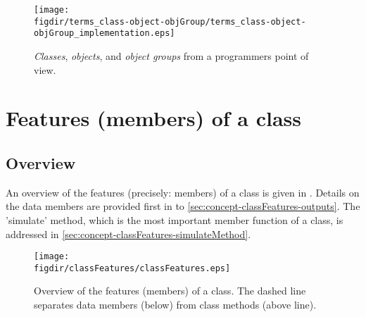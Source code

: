 \begin{figure}
  \centering
  \texttt{[image: \\figdir/terms\_class-object-objGroup/terms\_class-object-objGroup\_implementation.eps]}
  \caption[\emph{Classes}, \emph{objects}, and \emph{object groups} from a programmers point of view.]{\emph{Classes}, \emph{objects}, and \emph{object groups} from a programmers point of view. \label{fig:concept-terms_implementation}}
\end{figure}

\FloatBarrier

\section{Features (members) of a class} \label{sec:concept-classFeatures}

\subsection{Overview} \label{sec:concept-classFeatures-overview}

An overview of the features (precisely: members) of a class is given in . Details on the data members are provided first in  to \ref{sec:concept-classFeatures-outputs}. The 'simulate' method, which is the most important member function of a class, is addressed in \ref{sec:concept-classFeatures-simulateMethod}.

\begin{figure}
  \centering
  \texttt{[image: \\figdir/classFeatures/classFeatures.eps]}
  \caption[Overview of the features of a class.]{Overview of the features (members) of a class. The dashed line separates data members (below) from class methods (above line). \label{fig:concept-classFeatures-overview}}
\end{figure}

